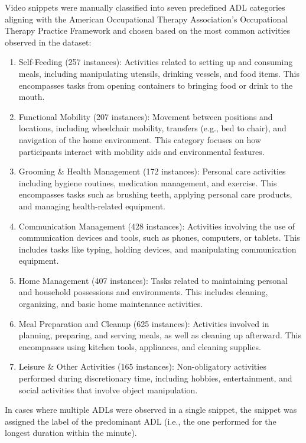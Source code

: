 \documentclass[journal,twoside,web]{ieeecolor}
\begin{document}
Video snippets were manually classified into seven predefined ADL categories aligning with the American Occupational Therapy Association's Occupational Therapy Practice Framework \cite{Aota2020-xa} and chosen based on the most common activities observed in the dataset:

\begin{enumerate}
    \item Self-Feeding (257 instances): Activities related to setting up and consuming meals, including manipulating utensils, drinking vessels, and food items. This encompasses tasks from opening containers to bringing food or drink to the mouth.
    \item Functional Mobility (207 instances): Movement between positions and locations, including wheelchair mobility, transfers (e.g., bed to chair), and navigation of the home environment. This category focuses on how participants interact with mobility aids and environmental features.
    \item Grooming \& Health Management (172 instances): Personal care activities including hygiene routines, medication management, and exercise. This encompasses tasks such as brushing teeth, applying personal care products, and managing health-related equipment.
    \item Communication Management (428 instances): Activities involving the use of communication devices and tools, such as phones, computers, or tablets. This includes tasks like typing, holding devices, and manipulating communication equipment.
    \item Home Management (407 instances): Tasks related to maintaining personal and household possessions and environments. This includes cleaning, organizing, and basic home maintenance activities.
    \item Meal Preparation and Cleanup (625 instances): Activities involved in planning, preparing, and serving meals, as well as cleaning up afterward. This encompasses using kitchen tools, appliances, and cleaning supplies.
    \item Leisure \& Other Activities (165 instances): Non-obligatory activities performed during discretionary time, including hobbies, entertainment, and social activities that involve object manipulation.
\end{enumerate}

In cases where multiple ADLs were observed in a single snippet, the snippet was assigned the label of the predominant ADL (i.e., the one performed for the longest duration within the minute).
\end{document}
